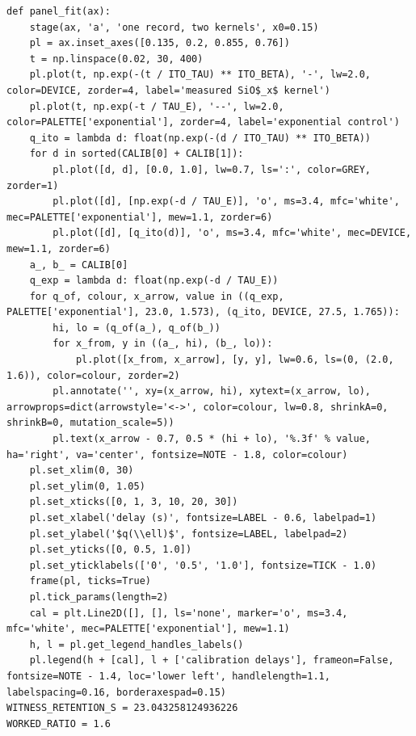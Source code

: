 \documentclass[a4paper,10pt]{article}
\begin{document}
\begin{Verbatim}
def panel_fit(ax):
    stage(ax, 'a', 'one record, two kernels', x0=0.15)
    pl = ax.inset_axes([0.135, 0.2, 0.855, 0.76])
    t = np.linspace(0.02, 30, 400)
    pl.plot(t, np.exp(-(t / ITO_TAU) ** ITO_BETA), '-', lw=2.0, color=DEVICE, zorder=4, label='measured SiO$_x$ kernel')
    pl.plot(t, np.exp(-t / TAU_E), '--', lw=2.0, color=PALETTE['exponential'], zorder=4, label='exponential control')
    q_ito = lambda d: float(np.exp(-(d / ITO_TAU) ** ITO_BETA))
    for d in sorted(CALIB[0] + CALIB[1]):
        pl.plot([d, d], [0.0, 1.0], lw=0.7, ls=':', color=GREY, zorder=1)
        pl.plot([d], [np.exp(-d / TAU_E)], 'o', ms=3.4, mfc='white', mec=PALETTE['exponential'], mew=1.1, zorder=6)
        pl.plot([d], [q_ito(d)], 'o', ms=3.4, mfc='white', mec=DEVICE, mew=1.1, zorder=6)
    a_, b_ = CALIB[0]
    q_exp = lambda d: float(np.exp(-d / TAU_E))
    for q_of, colour, x_arrow, value in ((q_exp, PALETTE['exponential'], 23.0, 1.573), (q_ito, DEVICE, 27.5, 1.765)):
        hi, lo = (q_of(a_), q_of(b_))
        for x_from, y in ((a_, hi), (b_, lo)):
            pl.plot([x_from, x_arrow], [y, y], lw=0.6, ls=(0, (2.0, 1.6)), color=colour, zorder=2)
        pl.annotate('', xy=(x_arrow, hi), xytext=(x_arrow, lo), arrowprops=dict(arrowstyle='<->', color=colour, lw=0.8, shrinkA=0, shrinkB=0, mutation_scale=5))
        pl.text(x_arrow - 0.7, 0.5 * (hi + lo), '%.3f' % value, ha='right', va='center', fontsize=NOTE - 1.8, color=colour)
    pl.set_xlim(0, 30)
    pl.set_ylim(0, 1.05)
    pl.set_xticks([0, 1, 3, 10, 20, 30])
    pl.set_xlabel('delay (s)', fontsize=LABEL - 0.6, labelpad=1)
    pl.set_ylabel('$q(\\ell)$', fontsize=LABEL, labelpad=2)
    pl.set_yticks([0, 0.5, 1.0])
    pl.set_yticklabels(['0', '0.5', '1.0'], fontsize=TICK - 1.0)
    frame(pl, ticks=True)
    pl.tick_params(length=2)
    cal = plt.Line2D([], [], ls='none', marker='o', ms=3.4, mfc='white', mec=PALETTE['exponential'], mew=1.1)
    h, l = pl.get_legend_handles_labels()
    pl.legend(h + [cal], l + ['calibration delays'], frameon=False, fontsize=NOTE - 1.4, loc='lower left', handlelength=1.1, labelspacing=0.16, borderaxespad=0.15)
WITNESS_RETENTION_S = 23.043258124936226
WORKED_RATIO = 1.6


\end{Verbatim}
\end{document}
